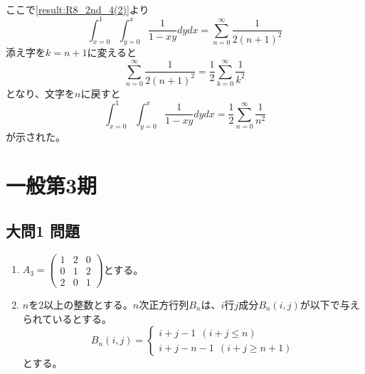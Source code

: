 \documentclass[dvipdfmx]{jsreport}
\begin{document}
\begin{souanswer}
\begin{enumerate}
\begin{align*}
\end{align*}
    ここで\ref{result:R8_2nd_4(2)}より
\begin{equation*}
    \int_{x= 0}^1 \int_{y= 0}^x \frac{1}{1- xy}dydx= \sum_{n= 0}^\infty \frac{1}{2(n+ 1)^2}
\end{equation*}
    添え字を$k= n+ 1$に変えると
\begin{equation*}
    \sum_{n= 0}^\infty \frac{1}{2(n+ 1)^2}= \frac{1}{2}\sum_{k= 0}^\infty \frac{1}{k^2}
\end{equation*}
    となり、文字を$n$に戻すと
\begin{equation*}
    \int_{x= 0}^1 \int_{y= 0}^x \frac{1}{1- xy}dydx= \frac{1}{2}\sum_{n= 0}^\infty \frac{1}{n^2}
\end{equation*}
    が示された。
\end{enumerate}
\end{souanswer}

\chapter{一般第3期}
\section{大問1 問題}
\begin{tcolorbox} %
\begin{enumerate}
	\item $A_3= \begin{pmatrix}1& 2& 0\\ 0& 1& 2\\ 2& 0& 1\end{pmatrix}$とする。
	\item $n$を2以上の整数とする。$n$次正方行列$B_n$は、$i$行$j$成分$B_n(i, j)$が以下で与えられているとする。
\begin{equation*}
	B_n({i, j})= 
\begin{cases}
	i+ j- 1\ \ (i+ j\le n)\\
	i+ j- n- 1\ \ (i+ j\ge n+ 1) 
\end{cases}
\end{equation*}
	とする。
\end{enumerate}
\end{tcolorbox}
\end{document}
